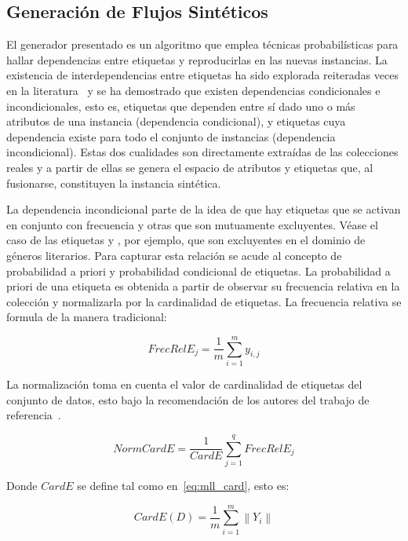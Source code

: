\subsection{Generación de Flujos Sintéticos}
\label{generacion_flujos_sinteticos}

El generador presentado es un algoritmo que emplea técnicas probabilísticas para
hallar dependencias entre etiquetas y reproducirlas en las nuevas instancias. La
existencia de interdependencias entre etiquetas ha sido explorada reiteradas
veces en la literatura~\cite{tsoumakas_multi-label_2007, read_multi-label_2008}
y se ha demostrado que existen dependencias condicionales e incondicionales,
esto es, etiquetas que dependen entre sí dado uno o más atributos de una
instancia (dependencia condicional), y etiquetas cuya dependencia existe para
todo el conjunto de instancias (dependencia incondicional). Estas dos cualidades
son directamente extraídas de las colecciones reales y a partir de ellas se
genera el espacio de atributos y etiquetas que, al fusionarse, constituyen la
instancia sintética.

La dependencia incondicional parte de la idea de que hay etiquetas que se
activan en conjunto con frecuencia y otras que son mutuamente excluyentes. Véase
el caso de las etiquetas  y , por ejemplo, que son excluyentes en el dominio de géneros literarios.
Para capturar esta relación se acude al concepto de probabilidad a priori y
probabilidad condicional de etiquetas. La probabilidad a priori de una etiqueta
es obtenida a partir de observar su frecuencia relativa en la colección y
normalizarla por la cardinalidad de etiquetas. La frecuencia relativa se formula
de la manera tradicional:

\begin{equation}
	FrecRelE_{j} = \frac{1}{m} \sum_{i=1}^{m} y_{i,j}
\end{equation}

La normalización toma en cuenta el valor de cardinalidad de etiquetas del
conjunto de datos, esto bajo la recomendación de los autores del trabajo de
referencia~\cite{read_scalable_2012}.

\begin{equation}
	NormCardE = \frac{1}{CardE} \sum_{j=1}^{q} FrecRelE_{j}
\end{equation}

Donde $CardE$ se define tal como en~\ref{eq:mll_card}, esto es:

\begin{equation}
	CardE(D) = \frac{1}{m} \sum_{i=1}^{m} \left\|Y_{i}\right\|
\end{equation}

